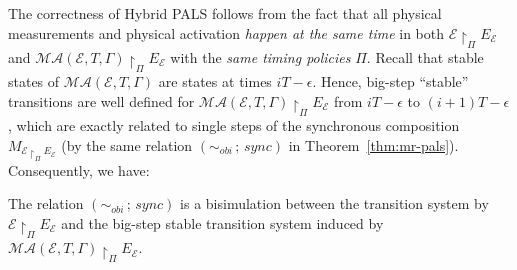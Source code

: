 The correctness of Hybrid PALS follows from the fact that 
all physical measurements and physical activation \emph{happen at the same time}
in both $\mathcal{E} \restriction_{\Pi} E_\mathcal{E}$  and $\mathcal{MA}(\mathcal{E}, T, \Gamma) \restriction_{\Pi} E_\mathcal{E}$ with the \emph{same timing policies} $\Pi$.
%
Recall that stable states of $\mathcal{MA}(\mathcal{E}, T, \Gamma)$ are states at times $iT - \epsilon$.
Hence,  big-step ``stable'' transitions are well defined for 
$\mathcal{MA}(\mathcal{E}, T, \Gamma) \restriction_{\Pi} E_\mathcal{E}$
from $iT - \epsilon$ to $(i+1)T-\epsilon$,
which are exactly related to single steps of the synchronous composition 
$M_{\mathcal{E} \restriction_{\Pi} E_\mathcal{E}}$ (by the same relation $(\sim_\mathit{obi} \,;\, \mathit{sync})$ in Theorem~\ref{thm:mr-pals}).
Consequently, we have:


\begin{theorem}\label{thm:hybrid-pals} 
The relation $(\sim_\mathit{obi} \,;\, \mathit{sync})$ 
is a bisimulation between 
the transition system by $\mathcal{E} \restriction_{\Pi} E_\mathcal{E}$ 
and the big-step stable transition system induced by $\mathcal{MA}(\mathcal{E}, T, \Gamma) \restriction_{\Pi} E_\mathcal{E}$.
\end{theorem}






